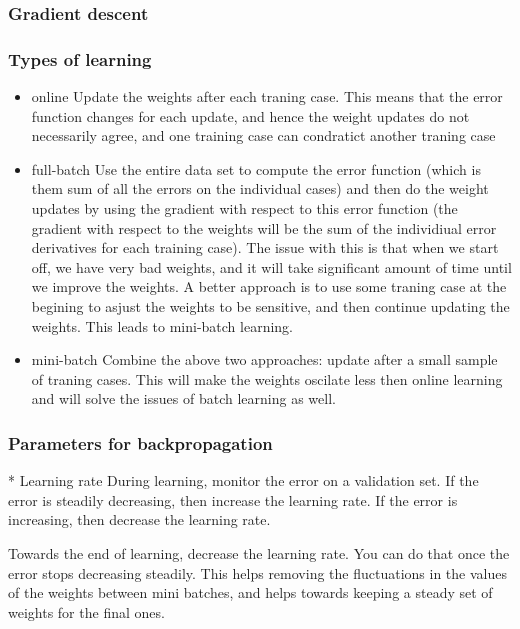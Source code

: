 \documentclass[11pt, fleqn, twoside]{article}
\begin{document}
\subsubsection{ Gradient descent}

\subsubsection{ Types of learning}

\begin{itemize}
  \item online
     Update the weights after each traning case. This means that the error function changes for each update, and hence the weight updates do not necessarily agree, and one training case can condratict another traning case
  \item full-batch
    Use the entire data set to compute the error function (which is them sum of all the errors on the individual cases) and then do the weight updates by using the gradient with respect to this error function (the gradient with respect to the weights will be the sum of the individiual error derivatives for each training case). The issue with this is that when we start off, we have very bad weights, and it will take significant amount of time until we improve the weights. A better approach is to use some traning case at the begining to asjust the weights to be sensitive, and then continue updating the weights. This leads to mini-batch learning.
  \item mini-batch
    Combine the above two approaches: update after a small sample of traning cases. This will make the weights oscilate less then online learning and will solve the issues of batch learning as well.
\end{itemize}

\subsubsection{ Parameters for backpropagation}

  * Learning rate
      During learning, monitor the error on a validation set.
      If the error is steadily decreasing, then increase the learning rate.
      If the error is increasing, then decrease the learning rate.

      Towards the end of learning, decrease the learning rate. You can do that once the
      error stops decreasing steadily. This helps removing the fluctuations in the values of the weights between mini batches, and helps towards keeping a steady set of weights for the final ones.
\end{document}
